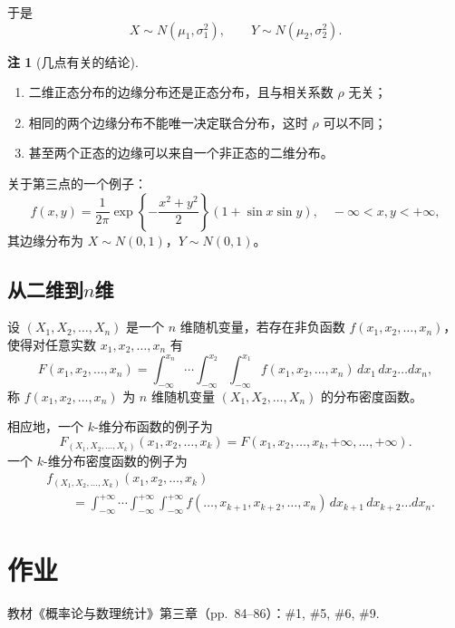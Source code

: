 \documentclass[11pt,a4paper]{report}
\theoremstyle{definition}
\newtheorem{note}{注}[chapter]
\begin{document}
于是
\[
X\sim N(\mu_{1},\sigma_{1}^{2}),\qquad Y\sim N(\mu_{2},\sigma_{2}^{2}).
\]

\begin{note}[几点有关的结论]
\begin{enumerate}[leftmargin=2em]
    \item 二维正态分布的边缘分布还是正态分布，且与相关系数 $\rho$ 无关；
    \item 相同的两个边缘分布不能唯一决定联合分布，这时 $\rho$ 可以不同；
    \item 甚至两个正态的边缘可以来自一个非正态的二维分布。
\end{enumerate}
\end{note}

关于第三点的一个例子：
\[
f(x,y)=\frac{1}{2\pi}\exp\left\{-\frac{x^{2}+y^{2}}{2}\right\}(1+\sin x\sin y),\quad -\infty<x,y<+\infty,
\]
其边缘分布为 $X\sim N(0,1)$，$Y\sim N(0,1)$。

\subsection{从二维到\texorpdfstring{$n$}{n}维}

设 $(X_{1},X_{2},\dots,X_{n})$ 是一个 $n$ 维随机变量，若存在非负函数 $f(x_{1},x_{2},\dots,x_{n})$，使得对任意实数 $x_{1},x_{2},\dots,x_{n}$ 有
\[
F(x_{1},x_{2},\dots,x_{n})=\int_{-\infty}^{x_{n}}\cdots\int_{-\infty}^{x_{2}}\int_{-\infty}^{x_{1}}f(x_{1},x_{2},\dots,x_{n})\,dx_{1}\,dx_{2}\dots dx_{n},
\]
称 $f(x_{1},x_{2},\dots,x_{n})$ 为 $n$ 维随机变量 $(X_{1},X_{2},\dots,X_{n})$ 的分布密度函数。

相应地，一个 $k$-维分布函数的例子为
\[
F_{(X_{1},X_{2},\dots,X_{k})}(x_{1},x_{2},\dots,x_{k})=F(x_{1},x_{2},\dots,x_{k},+\infty,\dots,+\infty).
\]
一个 $k$-维分布密度函数的例子为
\[
\begin{aligned}
&f_{(X_{1},X_{2},\dots,X_{k})}(x_{1},x_{2},\dots,x_{k}) \\
&\qquad=\int_{-\infty}^{+\infty}\cdots\int_{-\infty}^{+\infty}\int_{-\infty}^{+\infty}f(\dots,x_{k+1},x_{k+2},\dots,x_{n})\,dx_{k+1}\,dx_{k+2}\dots dx_{n}.
\end{aligned}
\]

\section*{作业}


教材《概率论与数理统计》第三章（pp.~84--86）：\#1, \#5, \#6, \#9.
\end{document}
